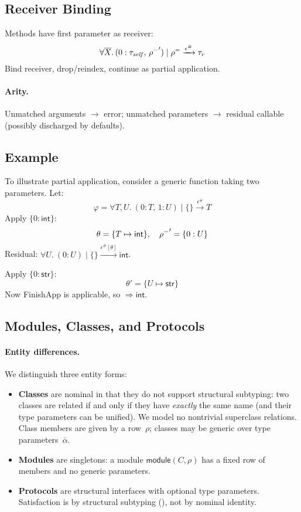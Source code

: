 \subsection{Receiver Binding}
\label{sec:receiver-binding}
Methods have first parameter as receiver:
\[
\forall \overline{X}.\,(0:\tau_{\mathit{self}},\,\mathord{\rho^{-}}') \mid \mathord{\rho^{=}} \xrightarrow{\epsilon^\#} \tau_r
\]
Bind receiver, drop/reindex, continue as partial application.

\paragraph{Arity.}
Unmatched arguments $\to$ error; unmatched parameters $\to$ residual callable (possibly discharged by defaults).

\subsection{Example}
To illustrate partial application, consider a generic function taking two parameters. Let:
\[
\varphi = \forall T,U.~(0:T,\,1:U) \mid \{\} \xrightarrow{\epsilon^\#} T
\]
Apply $\{0:\mathsf{int}\}$:
\[
\theta=\{T\mapsto \mathsf{int}\},\quad \mathord{\rho^{-}}'=\{0:U\}
\]
Residual: $\forall U.~(0:U) \mid \{\} \xrightarrow{\epsilon^\#[\theta]} \mathsf{int}$.

Apply $\{0:\mathsf{str}\}$:
\[
\theta'=\{U\mapsto \mathsf{str}\}
\]
Now \textsf{FinishApp} is applicable, so $\Rightarrow \mathsf{int}$.

\subsection{Modules, Classes, and Protocols}
\label{sec:modules-classes-protocols}

\paragraph{Entity differences.}
We distinguish three entity forms:
\begin{itemize}
    \item \textbf{Classes} are nominal in that they do not support structural subtyping: two classes are related if and only if they have \emph{exactly} the same name (and their type parameters can be unified). We model no nontrivial superclass relations. Class members are given by a row~$\rho$; classes may be generic over type parameters~$\overline{\alpha}$.
    \item \textbf{Modules} are singletons: a module $\mathsf{module}(C, \rho)$ has a fixed row of members and no generic parameters.
    \item \textbf{Protocols} are structural interfaces with optional type parameters. Satisfaction is by structural subtyping (), not by nominal identity.
\end{itemize}

